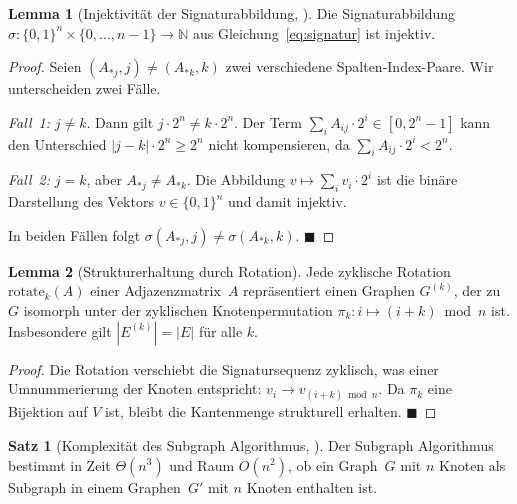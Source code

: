 ﻿\documentclass[a4paper,12pt]{article}
\theoremstyle{definition}
\newtheorem{satz}{Satz}[section]
\newtheorem{lemma}{Lemma}[section]
\begin{document}
\begin{lemma}[Injektivität der Signaturabbildung, \citealt{Epp2026}]
  \label{lem:injektivitaet}
  Die Signaturabbildung $\sigma: \{0,1\}^n \times \{0,\ldots,n-1\}
  \to \mathbb{N}$ aus Gleichung~\eqref{eq:signatur} ist injektiv.
\end{lemma}

\begin{proof}
  Seien $(A_{*j}, j) \neq (A_{*k}, k)$ zwei verschiedene
  Spalten-Index-Paare. Wir unterscheiden zwei Fälle.

  \emph{Fall~1:} $j \neq k$. Dann gilt $j \cdot 2^n \neq k \cdot 2^n$.
  Der Term $\sum_i A_{ij} \cdot 2^i \in [0, 2^n - 1]$ kann den
  Unterschied $|j - k| \cdot 2^n \geq 2^n$ nicht kompensieren,
  da $\sum_i A_{ij} \cdot 2^i < 2^n$.

  \emph{Fall~2:} $j = k$, aber $A_{*j} \neq A_{*k}$.
  Die Abbildung $v \mapsto \sum_i v_i \cdot 2^i$ ist die binäre
  Darstellung des Vektors $v \in \{0,1\}^n$ und damit injektiv.

  In beiden Fällen folgt $\sigma(A_{*j}, j) \neq \sigma(A_{*k}, k)$.
  \hfill$\blacksquare$
\end{proof}

\begin{lemma}[Strukturerhaltung durch Rotation]
  \label{lem:rot_strukturerhaltung}
  Jede zyklische Rotation $\mathrm{rotate}_k(A)$ einer
  Adjazenzmatrix~$A$ repräsentiert einen Graphen $G^{(k)}$, der
  zu $G$ isomorph unter der zyklischen Knotenpermutation
  $\pi_k: i \mapsto (i+k) \bmod n$ ist.
  Insbesondere gilt $|E^{(k)}| = |E|$ für alle $k$.
\end{lemma}

\begin{proof}
  Die Rotation verschiebt die Signatursequenz zyklisch, was einer
  Umnummerierung der Knoten entspricht: $v_i \to v_{(i+k) \bmod n}$.
  Da $\pi_k$ eine Bijektion auf $V$ ist, bleibt die Kantenmenge
  strukturell erhalten. \hfill$\blacksquare$
\end{proof}

\begin{satz}[Komplexität des Subgraph Algorithmus, \citealt{Epp2026}]
  \label{satz:komplexitaet}
  Der Subgraph Algorithmus bestimmt in Zeit $\Theta(n^3)$ und Raum
  $O(n^2)$, ob ein Graph~$G$ mit $n$ Knoten als Subgraph in einem
  Graphen~$G'$ mit $n$ Knoten enthalten ist.
\end{satz}
\end{document}
